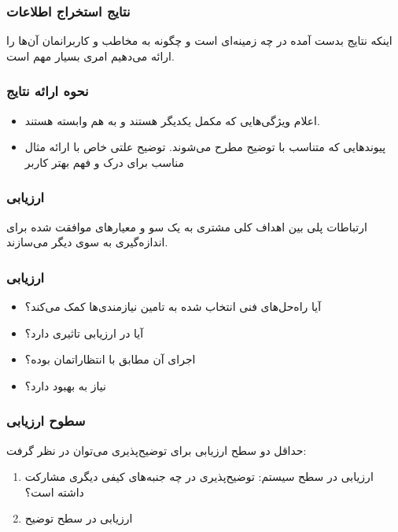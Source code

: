 \documentclass[10pt, a4paper]{beamer}
\begin{document}
\begin{frame}
    \frametitle{نتایج استخراج اطلاعات}

    \centering
    اینکه نتایج بدست آمده در چه زمینه‌ای است و چگونه به مخاطب و کاربرانمان آن‌ها
    را ارائه می‌دهیم امری بسیار مهم است.
\end{frame}

\begin{frame}
    \frametitle{نحوه ارائه نتایج}

    \begin{itemize}
        \item اعلام ویژگی‌هایی که مکمل یکدیگر هستند و به هم وابسته هستند.
        \item پیوند‌هایی که متناسب با توضیح مطرح می‌شوند. توضیح علتی خاص با
        ارائه مثال مناسب برای درک و فهم بهتر کاربر
    \end{itemize}
\end{frame}

\begin{frame}
    \frametitle{ارزیابی}

    \centering
    ارتباطات پلی بین اهداف کلی مشتری به یک سو و معیارهای موافقت‌ شده برای
    اندازه‌گیری به سوی دیگر می‌سازند.
\end{frame}

\begin{frame}
    \frametitle{ارزیابی}

    \begin{itemize}
        \item آیا راه‌حل‌های فنی انتخاب شده به تامین نیازمندی‌ها کمک می‌کند؟
        \item آیا در ارزیابی تاثیری دارد؟
        \item اجرای آن مطابق با انتظاراتمان بوده؟
        \item نیاز به بهبود دارد؟
    \end{itemize}
\end{frame}

\begin{frame}
    \frametitle{سطوح ارزیابی}
    حداقل دو سطح ارزیابی برای توضیح‌پذیری می‌توان در نظر گرفت:

    \begin{enumerate}
        \item ارزیابی در سطح سیستم: توضیح‌پذیری در چه جنبه‌های کیفی دیگری مشارکت
        داشته است؟
        \item ارزیابی در سطح توضیح
    \end{enumerate}
\end{frame}
\end{document}

